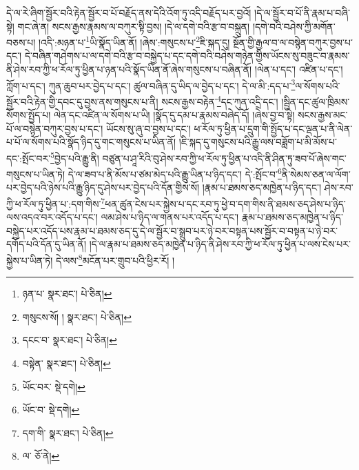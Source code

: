 དེ་ལ་རེ་ཞིག་སྦྱོར་བའི་རྟེན་སྦྱོར་བ་པོ་བརྗོད་ནས་དེའི་འོག་ཏུ་འདི་བརྗོད་པར་བྱའོ། །དེ་ལ་སྦྱོར་བ་པོ་ནི་རྣམ་པ་བཞི་སྟེ། གང་ཞེ་ན། སངས་རྒྱས་རྣམས་ལ་བཀུར་སྟི་བྱས། །དེ་ལ་དགེ་བའི་རྩ་བ་བསྐྲུན། །དགེ་བའི་བཤེས་ཀྱི་མགོན་བཅས་པ། །འདི་:མཉན་པ་\footnote{ཉན་པ་  སྣར་ཐང་།  པེ་ཅིན། }ཡི་སྣོད་ཡིན་ནོ། །ཞེས་:གསུངས་པ་\footnote{གསུངས་སོ། །  སྣར་ཐང་།  པེ་ཅིན། }ཇི་སྐད་དུ། སྔོན་གྱི་རྒྱལ་བ་ལ་བསྙེན་བཀུར་བྱས་པ་དང་། དེ་བཞིན་གཤེགས་པ་ལ་དགེ་བའི་རྩ་བ་བསྐྱེད་པ་དང་དགེ་བའི་བཤེས་གཉེན་གྱིས་ཡོངས་སུ་བཟུང་བ་རྣམས་ནི་ཤེས་རབ་ཀྱི་ཕ་རོལ་ཏུ་ཕྱིན་པ་ཉན་པའི་སྣོད་ཡིན་ནོ་ཞེས་གསུངས་པ་བཞིན་ནོ། །ལེན་པ་དང་། འཛིན་པ་དང་། ཀློག་པ་དང་། ཀུན་ཆུབ་པར་བྱེད་པ་དང་། ཚུལ་བཞིན་དུ་ཡིད་ལ་བྱེད་པ་དང་། དེ་ལ་མི་:དད་པ་\footnote{དངང་བ་  སྣར་ཐང་།  པེ་ཅིན། }ལ་སོགས་པའི་སྦྱོར་བའི་རྟེན་གྱི་དབང་དུ་བྱས་ནས་གསུངས་པ་ནི། སངས་རྒྱས་བརྟེན་\footnote{བསྟེན་  སྣར་ཐང་།  པེ་ཅིན། }དང་ཀུན་འདྲི་དང་། །སྦྱིན་དང་ཚུལ་ཁྲིམས་སོགས་སྤྱོད་པ། ལེན་དང་འཛིན་ལ་སོགས་པ་ཡི། །སྣོད་དུ་དམ་པ་རྣམས་བཞེད་དོ། །ཞེས་བྱ་བ་སྟེ། སངས་རྒྱས་མང་པོ་ལ་བསྙེན་བཀུར་བྱས་པ་དང་། ཡོངས་སུ་ཞུ་བ་བྱས་པ་དང་། ཕ་རོལ་ཏུ་ཕྱིན་པ་དྲུག་གི་སྤྱོད་པ་དང་ལྡན་པ་ནི་ལེན་པ་པོ་ལ་སོགས་པའི་སྣོད་ཉིད་དུ་གང་གསུངས་པ་ཡིན་ནོ། །ཇི་སྐད་དུ་གསུངས་པའི་རྒྱུ་ལས་བཟློག་པ་མི་མོས་པ་དང་:སྤོང་བར་\footnote{ཡོང་བར་  སྡེ་དགེ། }བྱེད་པའི་རྒྱུ་ནི། བཙུན་པ་ཤཱ་རིའི་བུ་ཤེས་རབ་ཀྱི་ཕ་རོལ་ཏུ་ཕྱིན་པ་འདི་ནི་ཤིན་ཏུ་ཟབ་པོ་ཞེས་གང་གསུངས་པ་ཡིན་ཏེ། དེ་ལ་ཟབ་པ་ནི་མོས་པ་ཙམ་མེད་པའི་རྒྱུ་ཡིན་པ་ཉིད་དང་། དེ་:སྤོང་བ་\footnote{ཡོང་བ་  སྡེ་དགེ། }ནི་སེམས་ཅན་ལ་ལོག་པར་བྱེད་པའི་ཉེས་པའི་རྒྱུ་ཉིད་དུ་ཤེས་པར་བྱེད་པའི་དོན་གྱིས་སོ། །རྣམ་པ་ཐམས་ཅད་མཁྱེན་པ་ཉིད་དང་། ཤེས་རབ་ཀྱི་ཕ་རོལ་ཏུ་ཕྱིན་པ་:དག་གིས་\footnote{དག་གི་  སྣར་ཐང་།  པེ་ཅིན། }ཕན་ཚུན་ངེས་པར་སྐྱེས་པ་དང་རབ་ཏུ་ཕྱེ་བ་དག་གིས་ནི་ཐམས་ཅད་ཤེས་པ་ཉིད་ལས་འདའ་བར་འདོད་པ་དང་། ལམ་ཤེས་པ་ཉིད་ལ་གནས་པར་འདོད་པ་དང་། རྣམ་པ་ཐམས་ཅད་མཁྱེན་པ་ཉིད་བསྐྱེད་པར་འདོད་པས་རྣམ་པ་ཐམས་ཅད་དུ་དེ་ལ་སྦྱོར་བ་སྒྲུབ་པར་ཉེ་བར་བསྟན་པས་སྦྱོར་བ་བསྟན་པ་ཉེ་བར་དགོད་པའི་དོན་དུ་ཡིན་ནོ། །དེ་ལ་རྣམ་པ་ཐམས་ཅད་མཁྱེན་པ་ཉིད་ནི་ཤེས་རབ་ཀྱི་ཕ་རོལ་ཏུ་ཕྱིན་པ་ལས་ངེས་པར་སྐྱེས་པ་ཡིན་ཏེ། དེ་ལས་\footnote{ལ་  ཅོ་ནེ། }མངོན་པར་གྲུབ་པའི་ཕྱིར་རོ། །
